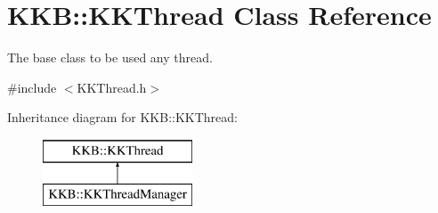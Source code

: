 \hypertarget{class_k_k_b_1_1_k_k_thread}{}\section{K\+KB\+:\+:K\+K\+Thread Class Reference}
\label{class_k_k_b_1_1_k_k_thread}


The base class to be used any thread.  




{\ttfamily \#include $<$K\+K\+Thread.\+h$>$}

Inheritance diagram for K\+KB\+:\+:K\+K\+Thread\+:\begin{figure}[H]
\begin{center}
\leavevmode
\includegraphics[height=2.000000cm]{class_k_k_b_1_1_k_k_thread}
\end{center}
\end{figure}

